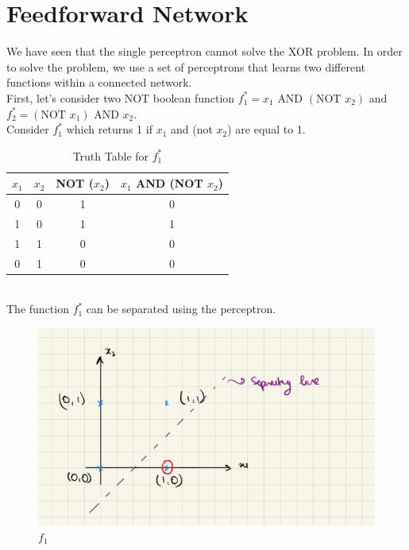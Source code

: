 \section{Feedforward Network}
We have seen that the single perceptron cannot solve the XOR problem. In order to solve the problem, we use a set of perceptrons that learns two different functions within a connected network.\vspace{5mm} \\
First, let's consider two NOT boolean function $f_1^{*} = x_1 \text{ AND } (\text{NOT }x_2)$ and $f_2^{*} = (\text{NOT }x_1) \text{ AND } x_2$. \vspace{5mm}\\
Consider $f_1^{*}$ which returns 1 if $x_1$ and (not $x_2$) are equal to 1.
\begin{table}
  \begin{center}
    \begin{tabular}{ c c c c}
      $x_1$ & $x_2$ & NOT ($x_2$) & $x_1$ AND (NOT $x_2$) \\
     \hline 
      0 & 0 & 1 & 0 \\  
      1 & 0 & 1 & 1 \\  
      1 & 1 & 0 & 0 \\  
      0 & 1 & 0 & 0 
    \end{tabular}
    \caption{Truth Table for $f_1^{*}$}
  \label{table:truth_table_f_1}
  \end{center}  
\end{table} \vspace{5mm}\\
The function $f_1^{*}$ can be separated using the perceptron.
\begin{figure}[ht]
  \centering
  \includegraphics[scale=0.15]{CHAPTER_2/c2_fig_f_1_XOR.jpeg}
  \caption{$f_1$}
  \label{fig:f1_XOR}
\end{figure} \\

